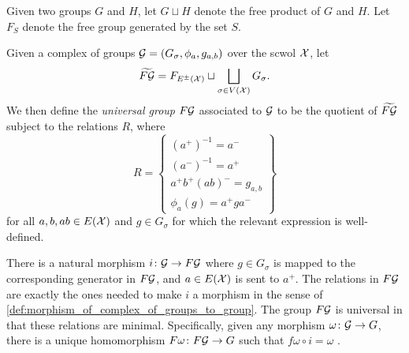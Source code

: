 Given two groups $G$ and $H$, let $G \sqcup H$ denote the free product of $G$ and $H$. 
Let $F_S$ denote the free group generated by the set $S$.
\begin{definition}
	Given a complex of groups $\mathcal{G} = (G_\sigma, \phi_a, g_{a,b})$ over the scwol $\mathcal{X}$, let
	\[
		\widetilde{F\mathcal{G}} =  F_{E^\pm(\mathcal{X})} \sqcup \bigsqcup_{\sigma \in V(\mathcal{X})} G_\sigma
		.\]
	We then define the \emph{universal group} $F\mathcal{G}$ associated to $\mathcal{G}$ to be the quotient of $\widetilde{F\mathcal{G}}$ subject to the relations  $R$, where
	\[
		R = \left\{
		\begin{array}{l}
			(a^+)^{-1}   = a^-     \\
			(a^-)^{-1}   = a^+     \\
			a^+b^+(ab)^- = g_{a,b} \\
			\phi_a(g)    = a^+ga^-
		\end{array}
		\right\}
	\]
	for all $a,b,ab \in E(\mathcal{X})$ and $g \in G_\sigma$ for which the relevant expression is well-defined.
\end{definition}
There is a natural morphism $i \colon \mathcal{G} \to F\mathcal{G}$ where $g \in G_\sigma$ is mapped to the corresponding generator in $F\mathcal{G}$, and  $a \in E(\mathcal{X})$ is sent to $a^+$.
The relations in $F\mathcal{G}$ are exactly the ones needed to make  $i$ a morphism in the sense of \cref{def:morphism_of_complex_of_groups_to_group}.
The group $F\mathcal{G}$ is universal in that these relations are minimal.
Specifically, given any morphism $\omega \colon \mathcal{G} \to G$, there is a unique homomorphism $F\omega \colon F\mathcal{G} \to G$ such that $f\omega \circ i = \omega$ \cite[Chapter 3.\textrm{\ensuremath{\calc}}, Section 3.2]{BrHa11}.


